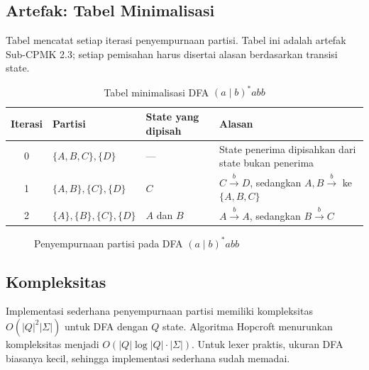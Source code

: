 \subsection{Artefak: Tabel Minimalisasi}

Tabel  mencatat setiap iterasi penyempurnaan
partisi. Tabel ini adalah artefak Sub-CPMK 2.3; setiap pemisahan
harus disertai alasan berdasarkan transisi state.

\begin{table}[H]
\centering
\caption{Tabel minimalisasi DFA \((a \mid b)^{*}abb\)}
\label{tab:ch06-minimasi}
\begin{tabularx}{\textwidth}{@{}c l X X@{}}
\toprule
\textbf{Iterasi} & \textbf{Partisi} & \textbf{State yang dipisah} &
\textbf{Alasan} \\
\midrule
0 & \(\{A,B,C\}, \{D\}\) & --- & State penerima dipisahkan dari
state bukan penerima \\
1 & \(\{A,B\}, \{C\}, \{D\}\) & \(C\) & \(C \xrightarrow{b} D\),
sedangkan \(A,B \xrightarrow{b}\) ke \(\{A,B,C\}\) \\
2 & \(\{A\}, \{B\}, \{C\}, \{D\}\) & \(A\) dan \(B\) &
\(A \xrightarrow{b} A\), sedangkan \(B \xrightarrow{b} C\) \\
\bottomrule
\end{tabularx}
\end{table}

\begin{figure}[H]
\centering
{}
\caption{Penyempurnaan partisi pada DFA \((a \mid b)^{*}abb\)}
\label{fig:ch06-partisi}
\end{figure}

\subsection{Kompleksitas}

Implementasi sederhana penyempurnaan partisi memiliki kompleksitas
\(O(|Q|^2 |\Sigma|)\) untuk DFA dengan \(Q\) state. Algoritma
Hopcroft menurunkan kompleksitas menjadi
\(O(|Q| \log |Q| \cdot |\Sigma|)\). Untuk lexer praktis, ukuran DFA
biasanya kecil, sehingga implementasi sederhana sudah memadai.

